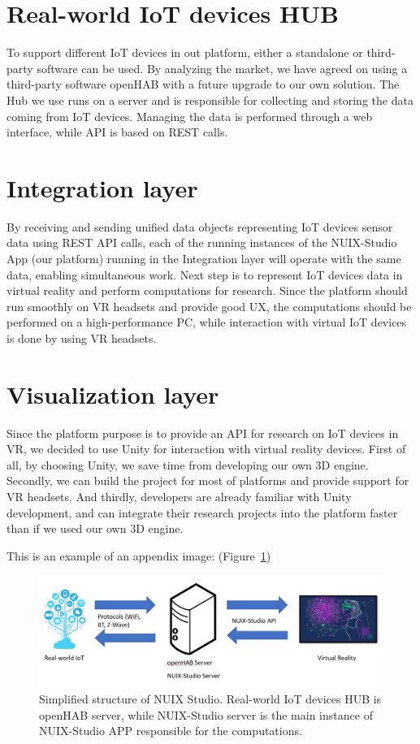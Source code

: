 \section{Real-world IoT devices HUB}
To support different IoT devices in out platform, either a standalone or third-party software can be used. By analyzing the market, we have agreed on using a third-party software openHAB with a future upgrade to our own solution. The Hub we use runs on a server and is responsible for collecting and storing the data coming from IoT devices. Managing the data is performed through a web interface, while API is based on REST calls.

\section{Integration layer}
By receiving and sending unified data objects representing IoT devices sensor data using REST API calls, each of the running instances of the NUIX-Studio App (our platform) running in the Integration layer will operate with the same data, enabling simultaneous work.
Next step is to represent IoT devices data in virtual reality and perform computations for research. Since the platform should run smoothly on VR headsets and provide good UX, the computations should be performed on a high-performance PC, while interaction with virtual IoT devices is done by using VR headsets. 

\section{Visualization layer}
Since the platform purpose is to provide an API for research on IoT devices in VR, we decided to use Unity for interaction with virtual reality devices. First of all, by choosing Unity, we save time from developing our own 3D engine. Secondly, we can build the project for most of platforms and provide support for VR headsets. And thirdly, developers are already familiar with Unity development, and can integrate their research projects into the platform faster than if we used our own 3D engine.

This is an example of an appendix image: (Figure~\ref{fig:BasicPlatformStructure-figure})

\begin{figure}
  \centering
  \includegraphics[width=0.6\linewidth]{figures/BasicPlatformStructure.png}
  \caption{Simplified structure of NUIX Studio. Real-world IoT devices HUB is openHAB server, while NUIX-Studio server is the main instance of NUIX-Studio APP responsible for the computations.}
  \label{fig:BasicPlatformStructure-figure}
\end{figure}


